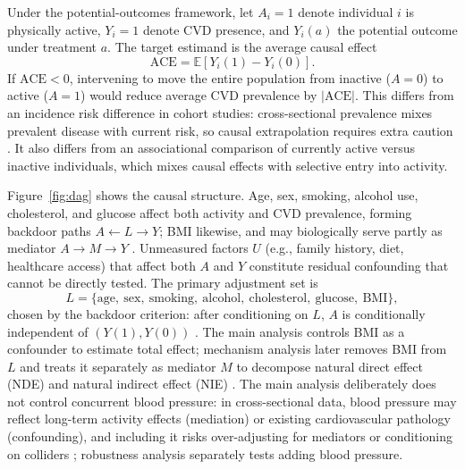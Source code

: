 \documentclass[12pt,a4paper]{article}
\newcommand{\E}{\mathbb{E}}
\begin{document}
Under the potential-outcomes framework, let $A_i=1$ denote individual $i$ is physically active, $Y_i=1$ denote CVD presence, and $Y_i(a)$ the potential outcome under treatment $a$. The target estimand is the average causal effect
\[
\mathrm{ACE}=\E[Y_i(1)-Y_i(0)].
\]
If $\mathrm{ACE}<0$, intervening to move the entire population from inactive ($A=0$) to active ($A=1$) would reduce average CVD prevalence by $|\mathrm{ACE}|$. This differs from an incidence risk difference in cohort studies: cross-sectional prevalence mixes prevalent disease with current risk, so causal extrapolation requires extra caution \cite{hernan2024whatif}. It also differs from an associational comparison of currently active versus inactive individuals, which mixes causal effects with selective entry into activity.

Figure~\ref{fig:dag} shows the causal structure. Age, sex, smoking, alcohol use, cholesterol, and glucose affect both activity and CVD prevalence, forming backdoor paths $A\leftarrow L\to Y$; BMI likewise, and may biologically serve partly as mediator $A\to M\to Y$ \cite{wang2023obesity,chen2023pa}. Unmeasured factors $U$ (e.g., family history, diet, healthcare access) that affect both $A$ and $Y$ constitute residual confounding that cannot be directly tested. The primary adjustment set is
\[
L=\{\text{age},\ \text{sex},\ \text{smoking},\ \text{alcohol},\ \text{cholesterol},\ \text{glucose},\ \text{BMI}\},
\]
chosen by the backdoor criterion: after conditioning on $L$, $A$ is conditionally independent of $(Y(1),Y(0))$ \cite{hernan2024whatif,rosenbaum1983central}. The main analysis controls BMI as a confounder to estimate total effect; mechanism analysis later removes BMI from $L$ and treats it separately as mediator $M$ to decompose natural direct effect (NDE) and natural indirect effect (NIE) \cite{vanderweele2015explanation}. The main analysis deliberately does not control concurrent blood pressure: in cross-sectional data, blood pressure may reflect long-term activity effects (mediation) or existing cardiovascular pathology (confounding), and including it risks over-adjusting for mediators or conditioning on colliders \cite{hernan2024whatif}; robustness analysis separately tests adding blood pressure.
\end{document}
